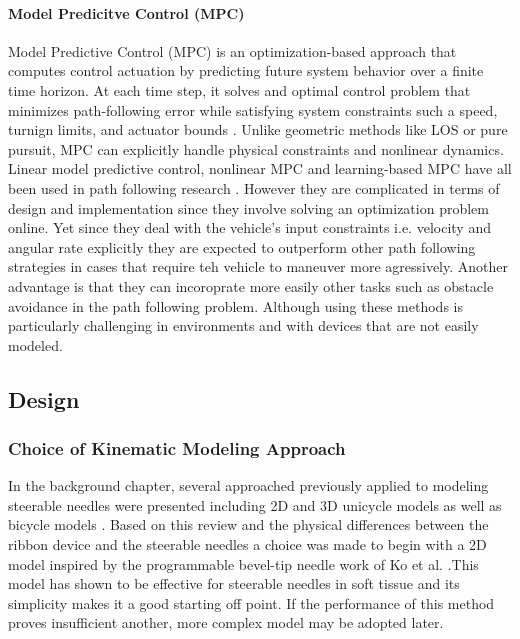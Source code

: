 \paragraph*{Model Predicitve Control (MPC)}
Model Predictive Control (MPC) is an optimization-based approach that computes control actuation by predicting future system behavior over a finite time horizon. At each time step, it solves and optimal control problem that minimizes path-following error while satisfying system constraints such a speed, turnign limits, and actuator bounds \cite{hung_review_2023}. 
\newline \newline
Unlike geometric methods like LOS or pure pursuit, MPC can explicitly handle physical constraints and nonlinear dynamics. Linear model predictive control, nonlinear MPC and learning-based MPC have all been used in path following research \cite{hung_review_2023}. However they are complicated in terms of design and implementation since they involve solving an optimization problem online. Yet since they deal with the vehicle's input constraints i.e. velocity and angular rate explicitly they are  expected to outperform other path following strategies in cases that require teh vehicle to maneuver more agressively. Another advantage is that they can incoroprate more easily other tasks such as obstacle avoidance in the path following problem. Although using these methods is particularly challenging in environments and with devices that are not easily modeled.





\subsection{Design}

\subsubsection{Choice of Kinematic Modeling Approach}
In the background chapter, several approached previously applied to modeling steerable needles were presented including 2D \cite{ko_two-dimensional_2010} and 3D unicycle models \cite{secoli_closed-loop_2013} as well as bicycle models \cite{webster_nonholonomic_2006} \cite{fallahi_extended_2015}. Based on this review and the physical differences between the ribbon device and the steerable needles a choice was made to begin with a 2D model inspired by the programmable bevel-tip needle work of Ko et al. \cite{ko_two-dimensional_2010}.This model has shown to be effective for steerable needles in soft tissue and its simplicity makes it a good starting off point. If the performance of this method proves insufficient another, more complex model may be adopted later.

